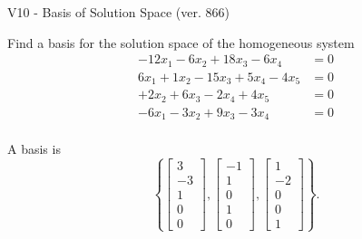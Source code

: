 \begin{exercise}
  \begin{exerciseTitle}V10 - Basis of Solution Space (ver. 866)\end{exerciseTitle}
  \begin{exerciseStatement}
    Find a basis for the solution space of the homogeneous system 
\begin{align*}
 -12 x_ 1 -6 x_ 2 + 18 x_ 3 -6 x_ 4 &= 0  \\ 
  6 x_ 1 + 1 x_ 2 -15 x_ 3 + 5 x_ 4 -4 x_ 5 &= 0  \\ 
  + 2 x_ 2 + 6 x_ 3 -2 x_ 4 + 4 x_ 5 &= 0  \\ 
  -6 x_ 1 -3 x_ 2 + 9 x_ 3 -3 x_ 4 &= 0  \\ 
 \end{align*}


 
  \end{exerciseStatement}

  \begin{exerciseAnswer}
   A basis is   
\[\left\{\left[\begin{array}{c}
3 \\
-3 \\
1 \\
0 \\
0
\end{array}\right] , \left[\begin{array}{c}
-1 \\
1 \\
0 \\
1 \\
0
\end{array}\right] , \left[\begin{array}{c}
1 \\
-2 \\
0 \\
0 \\
1
\end{array}\right]\right\}.\]

  


  \end{exerciseAnswer}
\end{exercise}